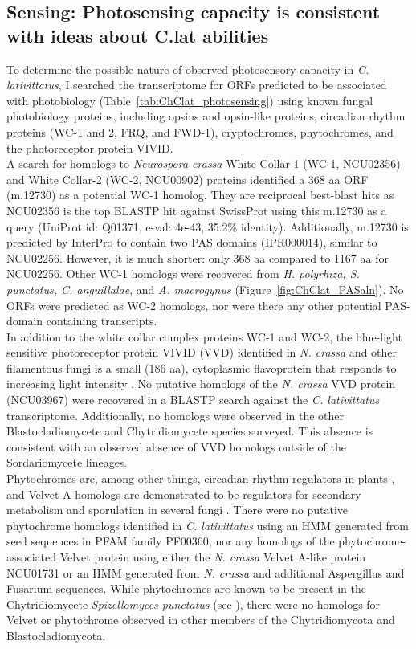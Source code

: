 \subsection*{Sensing: Photosensing capacity is consistent with ideas about C.lat abilities}
To determine the possible nature of observed photosensory capacity in \textit{C. lativittatus}, I searched the transcriptome for ORFs predicted to be associated with photobiology (Table~\ref{tab:ChClat_photosensing}) using known fungal photobiology proteins, including opsins and opsin-like proteins, circadian rhythm proteins (WC-1 and 2, FRQ, and FWD-1), cryptochromes, phytochromes, and the photoreceptor protein VIVID. \\
\indent A search for homologs to \textit{Neurospora crassa} White Collar-1 (WC-1, NCU02356) and White Collar-2 (WC-2, NCU00902) proteins identified a 368 aa ORF (m.12730) as a potential WC-1 homolog. They are reciprocal best-blast hits as NCU02356 is the top BLASTP hit against SwissProt using this m.12730 as a query (UniProt id: Q01371, e-val: 4e-43, 35.2\% identity). Additionally, m.12730 is predicted by InterPro to contain two PAS domains (IPR000014), similar to NCU02256. However, it is much shorter: only 368 aa compared to 1167 aa for NCU02256. Other WC-1 homologs were recovered from \textit{H. polyrhiza, S. punctatus, C. anguillalae}, and \textit{A. macrogynus} (Figure~\ref{fig:ChClat_PASaln}). No ORFs were predicted as WC-2 homologs, nor were there any other potential PAS-domain containing transcripts. \\
\indent In addition to the white collar complex proteins WC-1 and WC-2, the blue-light sensitive photoreceptor protein VIVID (VVD) identified in \textit{N. crassa} and other filamentous fungi is a small (186 aa), cytoplasmic flavoprotein that responds to increasing light intensity \cite{Schwerdtfeger2003}. No putative homologs of the \textit{N. crassa} VVD protein (NCU03967) were recovered in a BLASTP search against the \textit{C. lativittatus} transcriptome. Additionally, no homologs were observed in the other Blastocladiomycete and Chytridiomycete species surveyed. This absence is consistent with an observed absence of VVD homologs outside of the Sordariomycete lineages.\\
\indent Phytochromes are, among other things, circadian rhythm regulators in plants \cite{Rockwell2006}, and Velvet A homologs are demonstrated to be regulators for secondary metabolism and sporulation in several fungi \cite{Calvo2008}. There were no putative phytochrome homologs identified in \textit{C. lativittatus} using an HMM generated from seed sequences in PFAM family PF00360, nor any homologs of the phytochrome-associated Velvet protein using either the \textit{N. crassa} Velvet A-like protein NCU01731 or an HMM generated from \textit{N. crassa} and additional Aspergillus and Fusarium sequences. While phytochromes are known to be present in the Chytridiomycete \textit{Spizellomyces punctatus} (see \cite{Idnurm2010}), there were no homologs for Velvet or phytochrome observed in other members of the Chytridiomycota and Blastocladiomycota. \\
